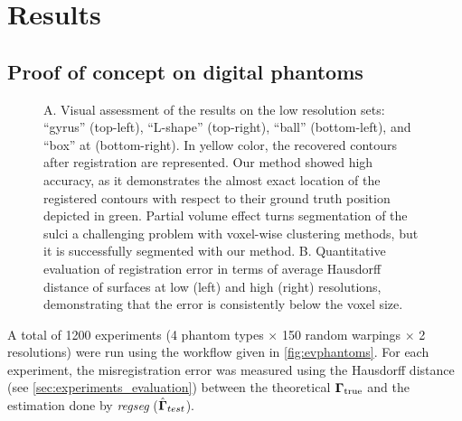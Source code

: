 \section{Results}
\label{sec:results}

\subsection{Proof of concept on digital phantoms}
\label{sec:results_phantom}

\begin{figure*}
    \centering
  \caption{A. Visual assessment of the results on the low resolution sets:
    ``gyrus'' (top-left), ``L-shape'' (top-right), ``ball'' (bottom-left),
    and ``box'' at (bottom-right).
  In yellow color, the recovered contours after registration are represented.
  Our method showed high accuracy, as it demonstrates the almost exact location of the registered
    contours with respect to their ground truth position depicted in green.
  Partial volume effect turns segmentation of the sulci a challenging problem with voxel-wise
    clustering methods, but it is successfully segmented with our method.
  B. Quantitative evaluation of registration error in terms of average Hausdorff distance of
    surfaces at low (left) and high (right) resolutions, demonstrating that the error is
    consistently below the voxel size.
    }\label{fig:phantom}
\end{figure*}
A total of 1200 experiments (4 phantom types $\times$ 150 random warpings $\times$ 2 resolutions) were
  run using the workflow given in \autoref{fig:evphantoms}.
For each experiment, the misregistration error was measured using the Hausdorff distance
  (see \autoref{sec:experiments_evaluation}) between the theoretical $\boldsymbol{\Gamma}_\text{true}$ and
  the estimation done by \emph{regseg} ($\hat{\boldsymbol{\Gamma}}_{test}$).

